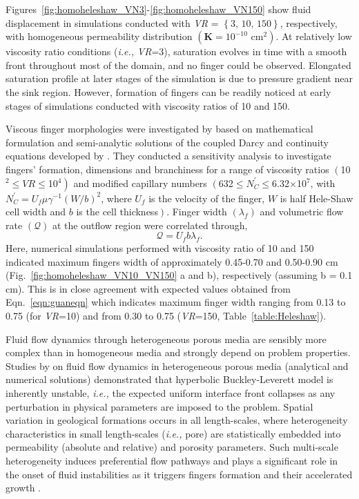 \documentclass[preprint,authoryear,12pt]{elsarticle}
\newcommand{\ie}{{\it i.e., }}
\begin{document}
\medskip
Figures~\ref{fig:homoheleshaw_VN3}-\ref{fig:homoheleshaw_VN150} show fluid displacement in simulations conducted with {\it VR} = $\left\{\text{3, 10, 150}\right\}$, respectively, with homogeneous permeability distribution $\left(\mathbf{K}=\text{10}^{-10}\text{ cm}^{2}\right)$. At relatively low viscosity ratio conditions (\ie {\it VR}=3), saturation evolves in time with a smooth front throughout most of the domain, and no finger could be observed. Elongated saturation profile at later stages of the simulation is due to pressure gradient near the sink region. However, formation of fingers can be readily noticed at early stages of simulations conducted with viscosity ratios of 10 and 150. 

\medskip
Viscous finger morphologies were investigated by \citet{guan_2003} based on mathematical formulation and semi-analytic solutions of the coupled Darcy and continuity equations developed by \citet{mclean_1981}. They conducted a sensitivity analysis to investigate fingers' formation, dimensions and branchiness for a range of viscosity ratios $\left(\right.$10$^{2}\le\textit{VR}\le$10$\left.^{4}\right)$ and modified capillary numbers $\left(\right.$632$\le N_{C}^{'}\le$6.32$\times$10$^{7}$, with $N_{C}^{'}= U_{f}\mu\gamma^{-1}(W/b)^{2}$, where $U_{f}$ is the velocity of the finger, $W$ is half Hele-Shaw cell width and $b$ is the cell thickness$\left.\right)$. Finger width $\left(\lambda_{f}\right)$ and volumetric flow rate $\left(\mathcal{Q}\right)$ at the outflow region were correlated through,   
\begin{equation}   
   \mathcal{Q} = U_{f} b \lambda_{f}.\label{eqn:guaneqn} 
\end{equation}  
Here, numerical simulations performed with viscosity ratio of 10 and 150 indicated maximum fingers width of approximately 0.45-0.70 and 0.50-0.90 cm (Fig.~\ref{fig:homoheleshaw_VN10_VN150} a and b), respectively (assuming b = 0.1 cm). This is in close agreement with expected values obtained from Eqn.~\ref{eqn:guaneqn} which indicates maximum finger width ranging from 0.13 to 0.75 (for {\it VR}=10) and from 0.30 to 0.75 ({\it VR}=150, Table~\ref{table:Heleshaw}). 
  
\medskip
Fluid flow dynamics through heterogeneous porous media are sensibly more complex than in homogeneous media and strongly depend on problem properties. Studies by \citet{langtangen_1992} on fluid flow dynamics in heterogeneous porous media (analytical and numerical solutions) demonstrated that hyperbolic Buckley-Leverett model is inherently unstable, \ie the expected uniform interface front collapses as any perturbation in physical parameters are imposed to the problem. Spatial variation in geological formations occurs in all length-scales, where heterogeneity characteristics in small length-scales (\ie pore) are statistically embedded into permeability (absolute and relative) and porosity parameters. Such multi-scale heterogeneity induces preferential flow pathways and plays a significant role in the onset of fluid instabilities as it triggers fingers formation and their accelerated growth \citep[see][]{ewing_1989,tchelepi_1994}. 
\end{document}
